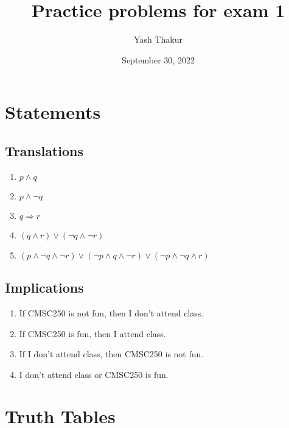 \documentclass[12pt, leqno]{article}
\title{Practice problems for exam 1}
\author{Yash Thakur}
\date{September 30, 2022}
\begin{document}
\maketitle

\section{Statements}

\subsection{Translations}

\begin{enumerate}
    \item $p \land q$
    \item $p \land \neg q$
    \item $q \Rightarrow r$
    \item $(q \land r) \lor (\neg q \land \neg r)$
    \item $(p \land \neg q \land \neg r) \lor (\neg p \land q \land \neg r) \lor (\neg p \land \neg q \land r)$
\end{enumerate}

\subsection{Implications}

\begin{enumerate}
    \item If CMSC250 is not fun, then I don't attend class.
    \item If CMSC250 is fun, then I attend class.
    \item If I don't attend class, then CMSC250 is not fun.
    \item I don't attend class or CMSC250 is fun.
\end{enumerate}

\section{Truth Tables}
\end{document}
